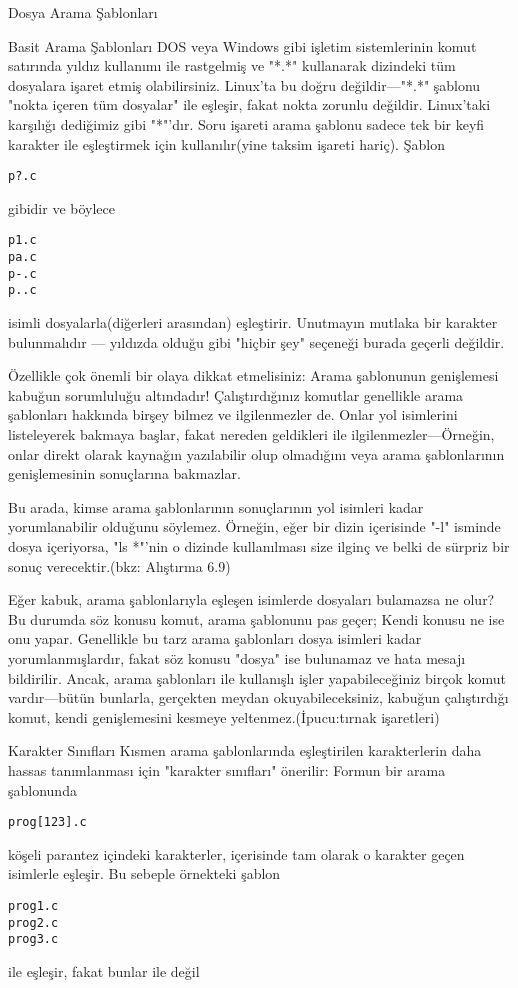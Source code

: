 \begin{section}{Dosya Arama Şablonları}
\begin{subsection}{Basit Arama Şablonları}
	DOS veya Windows gibi işletim sistemlerinin komut satırında yıldız kullanımı ile rastgelmiş ve "*.*" kullanarak dizindeki tüm dosyalara işaret etmiş olabilirsiniz. Linux'ta bu doğru değildir—"*.*" şablonu "nokta içeren tüm dosyalar" ile eşleşir, fakat nokta zorunlu değildir. Linux'taki karşılığı dediğimiz gibi "*"'dır.
Soru işareti arama şablonu sadece tek bir keyfi karakter ile eşleştirmek için kullanılır(yine taksim işareti hariç). Şablon
\begin{verbatim}
p?.c
\end{verbatim}
gibidir ve böylece
\begin{verbatim}
p1.c
pa.c
p-.c
p..c
\end{verbatim}
isimli dosyalarla(diğerleri arasından) eşleştirir. Unutmayın mutlaka bir karakter bulunmalıdır — yıldızda olduğu gibi "hiçbir şey" seçeneği burada geçerli değildir.

Özellikle çok önemli bir olaya dikkat etmelisiniz: Arama şablonunun genişlemesi kabuğun sorumluluğu altındadır! Çalıştırdığınız komutlar genellikle arama şablonları hakkında birşey bilmez ve ilgilenmezler de. Onlar yol isimlerini listeleyerek bakmaya başlar, fakat nereden geldikleri ile ilgilenmezler—Örneğin, onlar direkt olarak kaynağın yazılabilir olup olmadığını veya arama şablonlarının genişlemesinin sonuçlarına bakmazlar.

Bu arada, kimse arama şablonlarının sonuçlarının yol isimleri kadar yorumlanabilir olduğunu söylemez. Örneğin, eğer bir dizin içerisinde "-l" isminde dosya içeriyorsa,  "ls *"'nin o dizinde kullanılması size ilginç ve belki de sürpriz bir sonuç verecektir.(bkz: Alıştırma 6.9)

Eğer kabuk, arama şablonlarıyla eşleşen isimlerde dosyaları bulamazsa ne olur? Bu durumda söz konusu komut, arama şablonunu pas geçer; Kendi konusu ne ise onu yapar. Genellikle bu tarz arama şablonları dosya isimleri kadar yorumlanmışlardır, fakat söz konusu "dosya" ise bulunamaz ve hata mesajı bildirilir. Ancak, arama şablonları ile kullanışlı işler yapabileceğiniz birçok komut vardır—bütün bunlarla, gerçekten meydan okuyabileceksiniz, kabuğun çalıştırdığı komut, kendi genişlemesini kesmeye yeltenmez.(İpucu:tırnak işaretleri)
\end{subsection}
\begin{subsection}{Karakter Sınıfları}
Kısmen arama şablonlarında eşleştirilen karakterlerin daha hassas tanımlanması için "karakter sınıfları" önerilir: Formun bir arama şablonunda
\begin{verbatim}
prog[123].c
\end{verbatim}
köşeli parantez içindeki karakterler, içerisinde tam olarak o karakter geçen isimlerle eşleşir. Bu sebeple örnekteki şablon
\begin{verbatim}
prog1.c
prog2.c
prog3.c
\end{verbatim}
ile eşleşir, fakat bunlar ile değil


\end{subsection}
\end{section}
